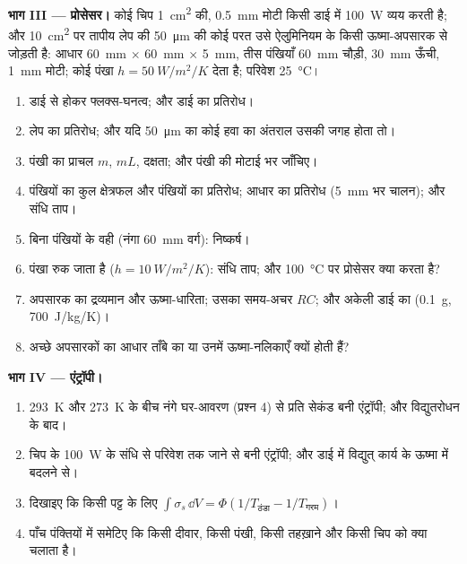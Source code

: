 \begin{problem}[{सप्ताहांत समस्या --- किसी इमारत के और किसी चिप के
पैमाने पर चालन}]
\textbf{भाग III --- प्रोसेसर।}
कोई चिप \qty{1}{cm^2} की, \qty{0.5}{mm} मोटी किसी डाई में \qty{100}{W}
व्यय करती है; और \qty{10}{cm^2} पर तापीय लेप की \qty{50}{\micro m} की कोई परत उसे
ऐलुमिनियम के किसी ऊष्मा-अपसारक से जोड़ती है: आधार \qty{60}{mm} $\times$ \qty{60}{mm} $\times$
\qty{5}{mm}, तीस पंखियाँ \qty{60}{mm} चौड़ी, \qty{30}{mm} ऊँची, \qty{1}{mm}
मोटी; कोई पंखा $h = \qty{50}{W/m^2/K}$ देता है; परिवेश \qty{25}{\celsius}।
\begin{enumerate}[resume]
  \item डाई से होकर फ्लक्स-घनत्व; और डाई का प्रतिरोध।
  \item लेप का प्रतिरोध; और यदि \qty{50}{\micro m} का कोई हवा का अंतराल
        उसकी जगह होता तो।
  \item पंखी का प्राचल $m$, $mL$, दक्षता; और पंखी की मोटाई भर  जाँचिए।
  \item पंखियों का कुल क्षेत्रफल और पंखियों का प्रतिरोध; आधार का
        प्रतिरोध (\qty{5}{mm} भर चालन); और संधि ताप।
  \item बिना पंखियों के वही (नंगा \qty{60}{mm} वर्ग): निष्कर्ष।
  \item पंखा रुक जाता है ($h = \qty{10}{W/m^2/K}$): संधि ताप;
        और \qty{100}{\celsius} पर प्रोसेसर क्या करता है?
  \item अपसारक का द्रव्यमान और ऊष्मा-धारिता; उसका समय-अचर $RC$;
        और अकेली डाई का (\qty{0.1}{g}, \qty{700}{J/kg/K})।
  \item अच्छे अपसारकों का आधार ताँबे का या उनमें ऊष्मा-नलिकाएँ क्यों होती हैं?
\end{enumerate}

\textbf{भाग IV --- एंट्रॉपी।}
\begin{enumerate}[resume]
  \item \qty{293}{K} और \qty{273}{K} के बीच नंगे घर-आवरण (प्रश्न 4) से
        प्रति सेकंड बनी एंट्रॉपी; और विद्युतरोधन के
        बाद।
  \item चिप के \qty{100}{W} के संधि से परिवेश तक जाने से बनी
        एंट्रॉपी; और डाई में विद्युत् कार्य के ऊष्मा में बदलने
        से।
  \item दिखाइए कि किसी पट्ट के लिए $\int\sigma_s\,\dd V = \Phi(1/T_{\text{ठंडा}} -
        1/T_{\text{गरम}})$।
  \item पाँच पंक्तियों में समेटिए कि किसी दीवार, किसी पंखी, किसी तहख़ाने
        और किसी चिप को क्या चलाता है।
\end{enumerate}
\end{problem}
